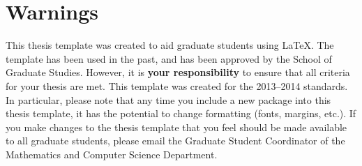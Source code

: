 \section[Warnings]{Warnings}
\label{sec:warnings}

This thesis template was created to aid graduate students using \LaTeX. The template has been used in the past, and has been approved by the School of Graduate Studies. However, it is {\bf your responsibility} to ensure that all criteria for your thesis are met. This template was created for the 2013--2014 standards. In particular, please note that any time you include a new package into this thesis template, it has the potential to change formatting (fonts, margins, etc.). If you make changes to the thesis template that you feel should be made available to all graduate students, please email the Graduate Student Coordinator of the Mathematics and Computer Science Department.
